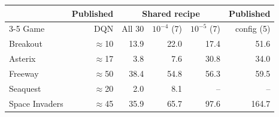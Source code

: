 \begin{tabular}{@{}lrrrrr@{}}
\toprule
 & Published & \multicolumn{3}{c}{Shared recipe} & Published \\
\cmidrule(lr){3-5}
Game & DQN & All 30 & $10^{-4}$ (7) & $10^{-5}$ (7) & config (5) \\
\midrule
Breakout & $\approx$10 & 13.9 & 22.0 & 17.4 & 51.6 \\
Asterix & $\approx$17 & 3.8 & 7.6 & 30.8 & 34.0 \\
Freeway & $\approx$50 & 38.4 & 54.8 & 56.3 & 59.5 \\
Seaquest & $\approx$20 & 2.0 & 8.1 & -- & -- \\
Space Invaders & $\approx$45 & 35.9 & 65.7 & 97.6 & 164.7 \\
\bottomrule
\end{tabular}
